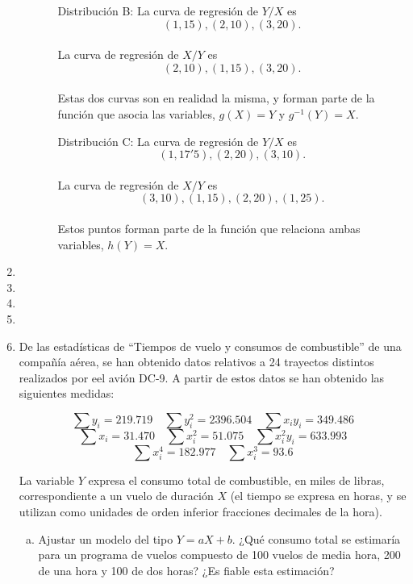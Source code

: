 \documentclass[10pt,a4paper]{article}
\begin{document}
\begin{enumerate}
\begin{itemize}
\begin{itemize}
\item[Distribución B:]La curva de regresión de $Y/X$ es $$(1,15), (2,10), (3,20).$$
\\La curva de regresión de $X/Y$ es $$(2,10), (1,15), (3,20).$$
\\Estas dos curvas son en realidad la misma, y forman parte de la función que asocia las variables, $g(X) = Y$ y $g^{-1}(Y) = X$.

\item[Distribución C:]La curva de regresión de $Y/X$ es $$(1, 17'5), (2, 20), (3, 10).$$
\\La curva de regresión de $X/Y$ es $$(3, 10), (1, 15), (2, 20), (1, 25).$$
\\Estos puntos forman parte de la función que relaciona ambas variables, $h(Y) = X$.

\end{itemize}

\end{itemize}

\newpage
\item
\newpage
\item
\newpage
\item
\newpage
\item
\newpage


        \item De las estadísticas de ``Tiempos de vuelo y consumos de combustible'' de una compañía aérea, se han obtenido datos relativos a 24 trayectos distintos realizados por eel avión DC-9. A partir de estos datos se han obtenido las siguientes medidas:
            \begin{center}
                \[
                \sum y_i = 219.719 \quad  \sum y_i^2 = 2396.504 \quad \sum x_i y_i = 349.486
                \]
                \[
                \sum x_i = 31.470 \quad \sum x_i^2 = 51.075 \quad \sum x_i^2 y_i = 633.993
                \]
                \[
                \sum x_i^4 = 182.977 \quad \sum x_i^3 = 93.6
                \]
            \end{center}
            La variable \(Y\) expresa el consumo total de combustible, en miles de libras, correspondiente a un vuelo de duración \(X\) (el tiempo se expresa en horas, y se utilizan como unidades de orden inferior fracciones decimales de la hora).

            \begin{enumerate}[a)]
                \item Ajustar un modelo del tipo \(Y=aX+b\). ¿Qué consumo total se estimaría para un programa de vuelos compuesto de 100 vuelos de media hora, 200 de una hora y 100 de dos horas? ¿Es fiable esta estimación?



\end{enumerate}
\end{enumerate}
\end{document}

